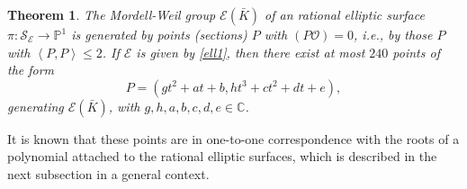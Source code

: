 \documentclass[11pt]{amsart}
\newcommand{\Kb}{{{\bar K}}}
\newcommand{\Pp}{{\mathbb P}}
\newcommand{\CC}{{\mathbb C}}
\newcommand{\Ee}{{\mathcal E}}
\newcommand{\OO}{{\mathcal O}}
\newcommand{\Sc}{{\mathcal S}}
\newtheorem{thm}{Theorem}[section]
\numberwithin{equation}{section}
\numberwithin{table}{section}
\newcommand\<{\langle}
\def\deg{\mbox{deg }}
\begin{document}
\begin{thm}
	\label{shi2}
	The Mordell-Weil  group  $\Ee(\Kb)$ of an rational elliptic surface	$\pi: \Sc_\Ee \rightarrow \Pp^1 $  is generated by points (sections) $P$ with $(P\OO)=0$, i.e.,
	by those $P$ with $ \left\langle P, P \right\rangle  \leq 2$.
	If $ \Ee$ is given by \eqref{ell1}, then 
	there exist
	at most $240$ points of the form 
	$$P=(g t^2+ a t +b, h t^3+ c t^2 + d t + e),$$
	generating $\Ee(\Kb)$, with $g, h, a, b, c, d, e \in \CC$.
\end{thm}






It is known that these points are in one-to-one correspondence with  the  roots of a polynomial
attached to the rational elliptic surfaces, which is described in the next subsection in a general context.
\end{document}
